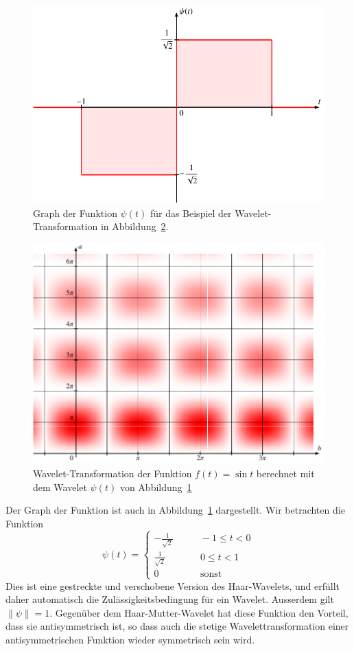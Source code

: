 \begin{beispiel}
\begin{figure}
\centering
\includegraphics{chapters/4-cwt/images/psigraph.pdf}
\caption{Graph der Funktion $\psi(t)$ für das Beispiel der
Wavelet-Transformation in Abbildung~\ref{cwt:psi-cwt}.
\label{cwt:psi-graph}}
\end{figure}
\begin{figure}
\centering
\includegraphics[width=\hsize]{chapters/4-cwt/images/psisin.pdf}
\caption{Wavelet-Transformation der Funktion $f(t)=\sin t$ berechnet
mit dem Wavelet $\psi(t)$ von Abbildung~\ref{cwt:psi-graph}
\label{cwt:psi-cwt}}
\end{figure}
Der Graph der Funktion ist auch in Abbildung~\ref{cwt:psi-graph} dargestellt.
Wir betrachten die Funktion
\[
\psi(t) = \begin{cases}
-\frac1{\sqrt{2}}&\qquad -1\le t< 0\\
\frac1{\sqrt{2}}&\qquad 0\le t< 1\\
0&\qquad\text{sonst}
\end{cases}
\]
Dies ist eine gestreckte und verschobene Version des Haar-Wavelets,
und erfüllt daher automatisch die Zulässigkeitsbedingung für ein Wavelet.
Ausserdem gilt $\|\psi\|=1$.
Gegenüber dem Haar-Mutter-Wavelet hat diese Funktion den Vorteil, dass 
sie antisymmetrisch ist, so dass auch die stetige Wavelettransformation
einer antisymmetrischen Funktion wieder symmetrisch sein wird.


\end{beispiel}
